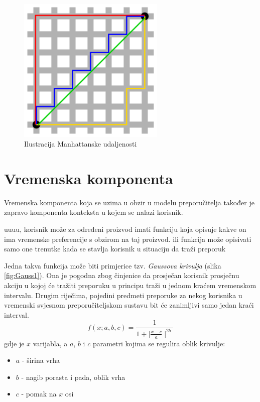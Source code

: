 \documentclass[times, utf8, diplomski, numeric]{fer}
\begin{document}
\begin{figure}[!htb]
	\centering
	\includegraphics[width=7cm]{images/Manhattan_distance.png}
	\caption{Ilustracija Manhattanske udaljenosti}
	\label{fig:ManhattanDistance}
\end{figure}



\section{Vremenska komponenta}

Vremenska komponenta koja se uzima u obzir u modelu preporučitelja također je
zapravo komponenta konteksta u kojem se nalazi korisnik. 

uuuu, korisnik može za određeni proizvod imati funkciju koja opisuje kakve on
ima vremenske preferencije s obzirom na taj proizvod. ili funkcija može
opisivati samo one trenutke kada se stavlja korisnik u situaciju da traži
preporuk

Jedna takva funkcija može biti primjerice tzv. \emph{Gaussova krivulja}
(slika \ref{fig:Gauss1}). Ona je pogodna zbog činjenice da prosječan korisnik
prosječnu akciju u kojoj će tražiti preporuku u principu traži u jednom kraćem
vremenskom intervalu. Drugim riječima, pojedini predmeti preporuke za nekog
korisnika u vremenski svjesnom preporučiteljskom sustavu bit će zanimljivi samo
jedan kraći interval.
\begin{equation}
	\label{eq:BellFunc}
	f(x;a,b,c) = \frac
	{
		1
	}
	{
		1 + \mid\frac{x - c}{a}\mid^{2b}
	}
\end{equation}
gdje je $x$ varijabla, a $a$, $b$ i $c$ parametri kojima se regulira oblik
krivulje:
\begin{itemize}
  \item $a$ - širina vrha
  \item $b$ - nagib porasta i pada, oblik vrha
  \item $c$ - pomak na $x$ osi
\end{itemize}
\end{document}

